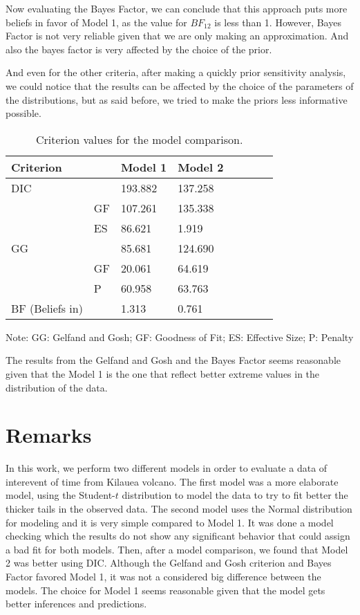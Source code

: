 \documentclass{asaproc}
\begin{document}
Now evaluating the Bayes Factor, we can conclude that this approach puts more beliefs in favor of Model 1, as the value for $BF_{12}$ is less than 1. However, Bayes Factor is not very reliable given that we are only making an approximation. And also the bayes factor is very affected by the choice of the prior.

And even for the other criteria, after making a quickly prior sensitivity analysis, we could notice that the results can be affected by the choice of the parameters of the distributions, but as said before, we tried to make the priors less informative possible.

\begin{table}[H]
\caption{Criterion values for the model comparison.}\label{criter}
\centering
\begin{tabular}{llllllcc}
\hline
Criterion & & Model 1 & Model 2 \\
\hline

DIC & & 193.882 & 137.258  \\
& GF & 107.261 & 135.338 \\
& ES  & 86.621 & 1.919 \\

GG & & 85.681 & 124.690 \\
& GF & 20.061 & 64.619  \\
& P  & 60.958 & 63.763 \\

BF (Beliefs in) & & 1.313  & 0.761 \\
\hline
\end{tabular}

Note: GG: Gelfand and Gosh; GF: Goodness of Fit; ES: Effective Size; P: Penalty
\end{table}

The results from the Gelfand and Gosh and the Bayes Factor seems reasonable given that the Model 1 is the one that reflect better extreme values in the distribution of the data.

\section{Remarks}

In this work, we perform two different models in order to evaluate a data of interevent of time from Kilauea volcano. The first model was a more elaborate model, using the Student-$t$ distribution to model the data to try to fit better the thicker tails in the observed data. The second model uses the Normal distribution for modeling and it is very simple compared to Model 1. It was done a model checking which the results do not show any significant behavior that could assign a bad fit for both models. Then, after a model comparison, we found that Model 2 was better using DIC. Although the Gelfand and Gosh criterion and Bayes Factor favored Model 1, it was not a considered big difference between the models. The choice for Model 1 seems reasonable given that the model gets better inferences and predictions. %
\end{document}
